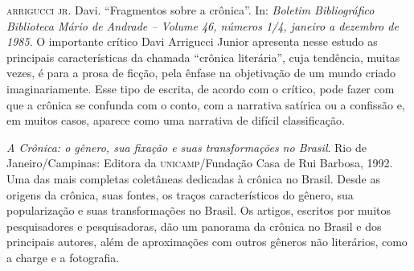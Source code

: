 \documentclass{extarticle}
\begin{document}
\textsc{arrigucci jr}. Davi. ``Fragmentos sobre a crônica''. In: \emph{Boletim
Bibliográfico Biblioteca Mário de Andrade -- Volume 46, números 1/4,
janeiro a dezembro de 1985}. O importante crítico Davi Arrigucci Junior
apresenta nesse estudo as principais características da chamada
``crônica literária'', cuja tendência, muitas vezes, é para a prosa de
ficção, pela ênfase na objetivação de um mundo criado imaginariamente.
Esse tipo de escrita, de acordo com o crítico, pode fazer com que a
crônica se confunda com o conto, com a narrativa satírica ou a confissão
e, em muitos casos, aparece como uma narrativa de difícil classificação.

\emph{A Crônica: o gênero, sua fixação e suas transformações no Brasil}.
Rio de Janeiro/Campinas: Editora da \textsc{unicamp}/Fundação Casa de Rui
Barbosa, 1992. Uma das mais completas coletâneas dedicadas à crônica no
Brasil. Desde as origens da crônica, suas fontes, os traços
característicos do gênero, sua popularização e suas transformações no
Brasil. Os artigos, escritos por muitos pesquisadores e pesquisadoras,
dão um panorama da crônica no Brasil e dos principais autores, além de
aproximações com outros gêneros não literários, como a charge e a
fotografia.
\end{document}
